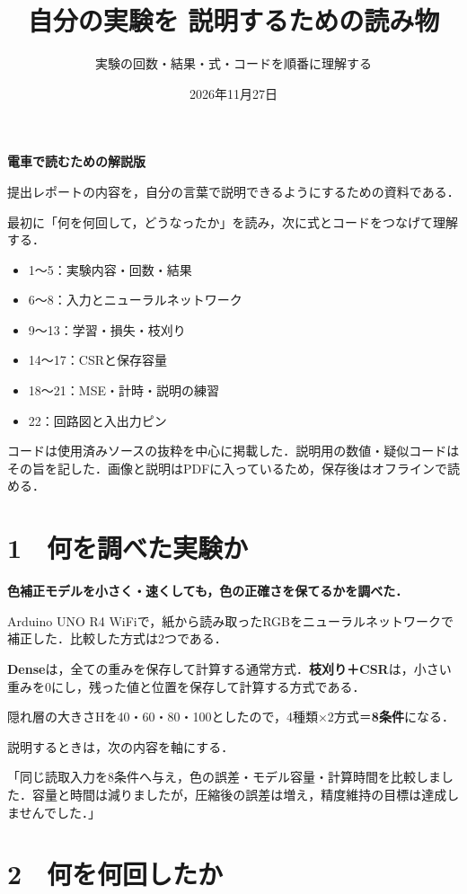 \documentclass[
  14pt,
  a5paper,
]{extarticle}
\title{自分の実験を 説明するための読み物}
\subtitle{実験の回数・結果・式・コードを順番に理解する}
\author{}
\date{2026年11月27日}
\makeatletter
\providecommand{\tightlist}{%
  \setlength{\itemsep}{0pt}\setlength{\parskip}{0pt}}
\renewcommand{\maketitle}{\begin{center}\vspace*{-5mm}{\LARGE\bfseries\@title\par}\vspace{3mm}{\normalsize\@date\par}\end{center}}
\makeatother
\begin{document}
\maketitle

\textbf{電車で読むための解説版}

提出レポートの内容を，自分の言葉で説明できるようにするための資料である．

最初に「何を何回して，どうなったか」を読み，次に式とコードをつなげて理解する．

\begin{itemize}
\tightlist
\item
  1〜5：実験内容・回数・結果
\item
  6〜8：入力とニューラルネットワーク
\item
  9〜13：学習・損失・枝刈り
\item
  14〜17：CSRと保存容量
\item
  18〜21：MSE・計時・説明の練習
\item
  22：回路図と入出力ピン
\end{itemize}

コードは使用済みソースの抜粋を中心に掲載した．説明用の数値・疑似コードはその旨を記した．画像と説明はPDFに入っているため，保存後はオフラインで読める．

\newpage

\section{1　何を調べた実験か}\label{ux4f55ux3092ux8abfux3079ux305fux5b9fux9a13ux304b}

\textbf{色補正モデルを小さく・速くしても，色の正確さを保てるかを調べた．}

Arduino UNO R4
WiFiで，紙から読み取ったRGBをニューラルネットワークで補正した．比較した方式は2つである．

\textbf{Dense}は，全ての重みを保存して計算する通常方式．\textbf{枝刈り＋CSR}は，小さい重みを0にし，残った値と位置を保存して計算する方式である．

隠れ層の大きさHを40・60・80・100としたので，4種類×2方式＝\textbf{8条件}になる．

説明するときは，次の内容を軸にする．

「同じ読取入力を8条件へ与え，色の誤差・モデル容量・計算時間を比較しました．容量と時間は減りましたが，圧縮後の誤差は増え，精度維持の目標は達成しませんでした．」

\newpage

\section{2　何を何回したか}\label{ux4f55ux3092ux4f55ux56deux3057ux305fux304b}
\end{document}
